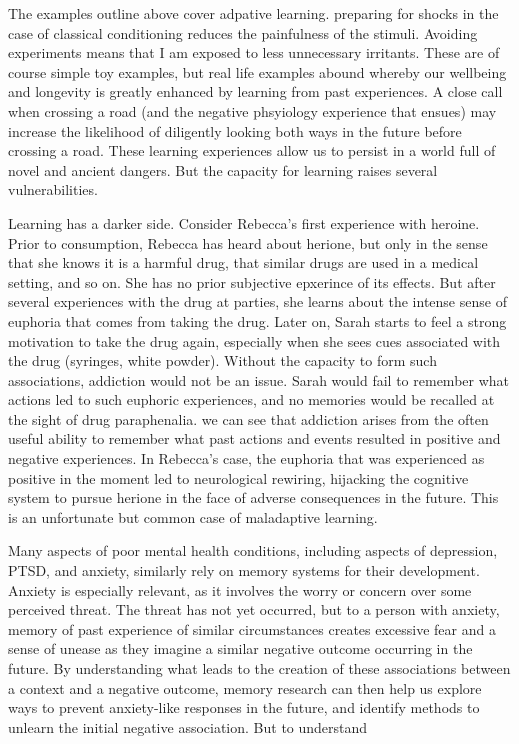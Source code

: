\documentclass[
  letterpaper,
  DIV=11,
  numbers=noendperiod,
  oneside]{scrartcl}
\begin{document}
The examples outline above cover adpative learning. preparing for shocks
in the case of classical conditioning reduces the painfulness of the
stimuli. Avoiding experiments means that I am exposed to less
unnecessary irritants. These are of course simple toy examples, but real
life examples abound whereby our wellbeing and longevity is greatly
enhanced by learning from past experiences. A close call when crossing a
road (and the negative phsyiology experience that ensues) may increase
the likelihood of diligently looking both ways in the future before
crossing a road. These learning experiences allow us to persist in a
world full of novel and ancient dangers. But the capacity for learning
raises several vulnerabilities.

Learning has a darker side. Consider Rebecca's first experience with
heroine. Prior to consumption, Rebecca has heard about herione, but only
in the sense that she knows it is a harmful drug, that similar drugs are
used in a medical setting, and so on. She has no prior subjective
epxerince of its effects. But after several experiences with the drug at
parties, she learns about the intense sense of euphoria that comes from
taking the drug. Later on, Sarah starts to feel a strong motivation to
take the drug again, especially when she sees cues associated with the
drug (syringes, white powder). Without the capacity to form such
associations, addiction would not be an issue. Sarah would fail to
remember what actions led to such euphoric experiences, and no memories
would be recalled at the sight of drug paraphenalia. we can see that
addiction arises from the often useful ability to remember what past
actions and events resulted in positive and negative experiences. In
Rebecca's case, the euphoria that was experienced as positive in the
moment led to neurological rewiring, hijacking the cognitive system to
pursue herione in the face of adverse consequences in the future. This
is an unfortunate but common case of maladaptive learning.

Many aspects of poor mental health conditions, including aspects of
depression, PTSD, and anxiety, similarly rely on memory systems for
their development. Anxiety is especially relevant, as it involves the
worry or concern over some perceived threat. The threat has not yet
occurred, but to a person with anxiety, memory of past experience of
similar circumstances creates excessive fear and a sense of unease as
they imagine a similar negative outcome occurring in the future. By
understanding what leads to the creation of these associations between a
context and a negative outcome, memory research can then help us explore
ways to prevent anxiety-like responses in the future, and identify
methods to unlearn the initial negative association. But to understand
\end{document}
